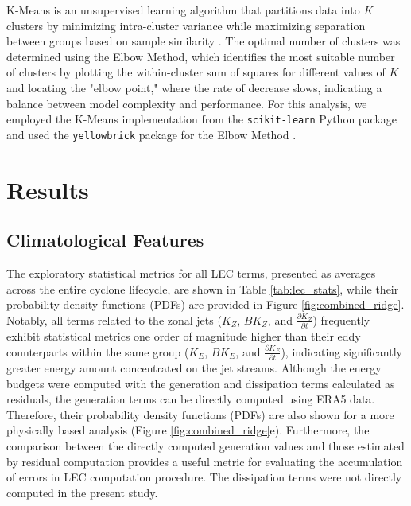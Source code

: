\documentclass[pdflatex,sn-chicago]{sn-jnl}%
\theoremstyle{plain}
\theoremstyle{definition}
\theoremstyle{remark}
\theoremstyle{definition}
\begin{document}
K-Means is an unsupervised learning algorithm that partitions data into \( K \) clusters by minimizing intra-cluster variance while maximizing separation between groups based on sample similarity \citep{macqueen1967,hartiganwong1979}. The optimal number of clusters was determined using the Elbow Method, which identifies the most suitable number of clusters by plotting the within-cluster sum of squares for different values of \( K \) and locating the "elbow point," where the rate of decrease slows, indicating a balance between model complexity and performance. For this analysis, we employed the K-Means implementation from the \texttt{scikit-learn} Python package \citep{hao2019machine} and used the \texttt{yellowbrick} package for the Elbow Method \citep{bengfort2019yellowbrick}.



\section{Results}\label{sec:results}

\subsection{Climatological Features}\label{sec:climatology}

The exploratory statistical metrics for all LEC terms, presented as averages across the entire cyclone lifecycle, are shown in Table \ref{tab:lec_stats}, while their probability density functions (PDFs) are provided in Figure \ref{fig:combined_ridge}. Notably, all terms related to the zonal jets ($K_Z$, $BK_Z$, and \(\frac{\partial K_Z}{\partial t}\)) frequently exhibit statistical metrics one order of magnitude higher than their eddy counterparts within the same group ($K_E$, $BK_E$, and \(\frac{\partial K_E}{\partial t}\)), indicating significantly greater energy amount concentrated on the jet streams. Although the energy budgets were computed with the generation and dissipation terms calculated as residuals, the generation terms can be directly computed using ERA5 data. Therefore, their probability density functions (PDFs) are also shown for a more physically based analysis (Figure \ref{fig:combined_ridge}e). Furthermore, the comparison between the directly computed generation values and those estimated by residual computation provides a useful metric for evaluating the accumulation of errors in LEC computation procedure. The dissipation terms were not directly computed in the present study.
\end{document}
